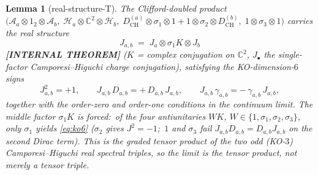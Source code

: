 \documentclass[11pt,a4paper]{article}
\theoremstyle{plain}
\newtheorem{lemma}[theorem]{Lemma}
\theoremstyle{definition}
\newcommand{\Hilb}{\mathcal{H}}
\newcommand{\Acal}{\mathcal{A}}
\newcommand{\C}{\mathbb{C}}
\newcommand{\DCH}{D_{\mathrm{CH}}}
\begin{document}
\begin{lemma}[real-structure-T]\label{lem:real_structure-T}
The Clifford-doubled product
$\bigl(\Acal_a \otimes 1_2 \otimes \Acal_b,\;
\Hilb_a \otimes \C^2 \otimes \Hilb_b,\;
\DCH^{(a)}\otimes\sigma_1\otimes 1 + 1\otimes\sigma_2\otimes\DCH^{(b)},\;
1\otimes\sigma_3\otimes 1\bigr)$ carries the real structure
\begin{equation}\label{eq:Jab}
   J_{a,b} \;=\; J_a \otimes \sigma_1 K \otimes J_b
\end{equation}
\textbf{[INTERNAL THEOREM]} ($K$ = complex conjugation on $\C^2$, $J_\bullet$ the single-factor
Camporesi--Higuchi charge conjugation), satisfying the KO-dimension-$6$
signs
\begin{equation}\label{eq:ko6}
   J_{a,b}^2 = +1, \qquad
   J_{a,b}\,D_{a,b} = +\,D_{a,b}\,J_{a,b}, \qquad
   J_{a,b}\,\gamma_{a,b} = -\,\gamma_{a,b}\,J_{a,b},
\end{equation}
together with the order-zero and order-one conditions in the continuum
limit. The middle factor $\sigma_1 K$ is forced:\ of the four antiunitaries
$W K$, $W \in \{1, \sigma_1, \sigma_2, \sigma_3\}$, only $\sigma_1$ yields
\eqref{eq:ko6} ($\sigma_2$ gives $J^2 = -1$;\ $1$ and $\sigma_3$ fail
$J_{a,b}D_{a,b} = D_{a,b}J_{a,b}$ on the second Dirac term). This is the
graded tensor product of the two odd (KO-$3$)
Camporesi--Higuchi real spectral triples, so the limit is \emph{the} tensor
product, not merely \emph{a} tensor triple.
\end{lemma}
\end{document}
